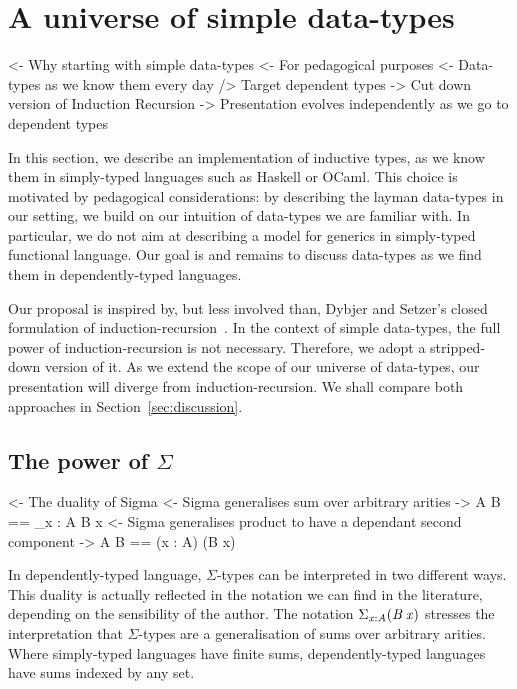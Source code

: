 \section{A universe of simple data-types}
\label{sec:universe-desc}

\begin{wstructure}
<- Why starting with simple data-types
    <- For pedagogical purposes
        <- Data-types as we know them every day
        /> Target dependent types
    -> Cut down version of Induction Recursion
        -> Presentation evolves independently as we go to dependent types
\end{wstructure}

In this section, we describe an implementation of inductive types, as
we know them in simply-typed languages such as Haskell or OCaml. This
choice is motivated by pedagogical considerations: by describing the
layman data-types in our setting, we build on our intuition of
data-types we are familiar with. In particular, we do not aim at
describing a model for generics in simply-typed functional
language. Our goal is and remains to discuss data-types as we find
them in dependently-typed languages.

Our proposal is inspired by, but less involved than, Dybjer and
Setzer's closed formulation of
induction-recursion~\cite{dybjer:general-ir, dybjer:axiom-ir,
  dybjer:ir-initial-algebra, dybjer:iir}. In the context of simple
data-types, the full power of induction-recursion is not
necessary. Therefore, we adopt a stripped-down version of it. As we
extend the scope of our universe of data-types, our presentation will
diverge from induction-recursion. We shall compare both approaches in
Section~\ref{sec:discussion}.

\subsection{The power of $\Sigma$}

\begin{wstructure}
<- The duality of Sigma
    <- Sigma generalises sum over arbitrary arities
        -> \Sigma A B == \Sigma_{x : A} B x
    <- Sigma generalises product to have a dependant second component
        -> \Sigma A B == (x : A) \times (B x)
\end{wstructure}

In dependently-typed language, $\Sigma$-types can be interpreted in
two different ways. This duality is actually reflected in the notation
we can find in the literature, depending on the sensibility of the author.
The notation $\blue{\Sigma}_{\V{x} : \V{A}} (\V{B}\: \V{x})$ stresses the interpretation that
$\Sigma$-types are a generalisation of sums over arbitrary arities.  Where
simply-typed languages have finite sums, dependently-typed languages have
sums indexed by any set.

